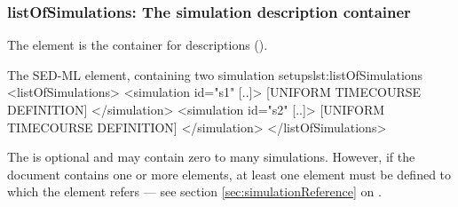   \subsubsection{listOfSimulations: The simulation description container}
\label{sec:listOfSimulations}

The  element is the container for  descriptions ().
%
%

%
\begin{myXmlLst}{The SED-ML  element, containing two simulation setups}{lst:listOfSimulations}
 <listOfSimulations>
  <simulation id="s1" [..]>
   [UNIFORM TIMECOURSE DEFINITION]
  </simulation>
  <simulation id="s2" [..]>
   [UNIFORM TIMECOURSE DEFINITION]
  </simulation>
 </listOfSimulations>
\end{myXmlLst}
%
The  is optional and may contain zero to many simulations. However, if the \LoneVtwo document contains one or more  elements, at least one  element must be defined to which  the  element refers --- see section \ref{sec:simulationReference} on .


